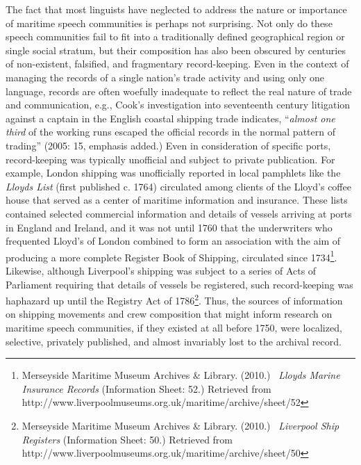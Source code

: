 \begin{styleStandard}
The fact that most linguists have neglected to address the nature or importance of maritime speech communities is perhaps not surprising. Not only do these speech communities fail to fit into a traditionally defined geographical region or single social stratum, but their composition has also been obscured by centuries of non-existent, falsified, and fragmentary record-keeping. Even in the context of managing the records of a single nation’s trade activity and using only one language, records are often woefully inadequate to reflect the real nature of trade and communication, e.g., Cook’s investigation into seventeenth century litigation against a captain in the English coastal shipping trade indicates, “\textit{almost one third} of the working runs escaped the official records in the normal pattern of trading” (2005: 15, emphasis added.) Even in consideration of specific ports, record-keeping was typically unofficial and subject to private publication. For example, London shipping was unofficially reported in local pamphlets like the \textit{Lloyd{\textquotesingle}s List }(first published c. 1764) circulated among clients of the Lloyd’s coffee house that served as a center of maritime information and insurance. These lists contained selected commercial information and details of vessels arriving at ports in England and Ireland, and it was not until 1760 that the underwriters who frequented Lloyd’s of London combined to form an association with the aim of producing a more complete Register Book of Shipping, circulated since 1734\footnote{ Merseyside Maritime Museum Archives \& Library. (2010.) \ \textit{Lloyds Marine Insurance Records} (Information Sheet: 52.) Retrieved from http://www.liverpoolmuseums.org.uk/maritime/archive/sheet/52}. Likewise, although Liverpool’s shipping was subject to a series of Acts of Parliament requiring that details of vessels be registered, such record-keeping was haphazard up until the Registry Act of 1786\footnote{ Merseyside Maritime Museum Archives \& Library. (2010.) \ \textit{Liverpool Ship Registers} (Information Sheet: 50.) Retrieved from http://www.liverpoolmuseums.org.uk/maritime/archive/sheet/50}. Thus, the sources of information on shipping movements and crew composition that might inform research on maritime speech communities, if they existed at all before 1750, were localized, selective, privately published, and almost invariably lost to the archival record. 
\end{styleStandard}


